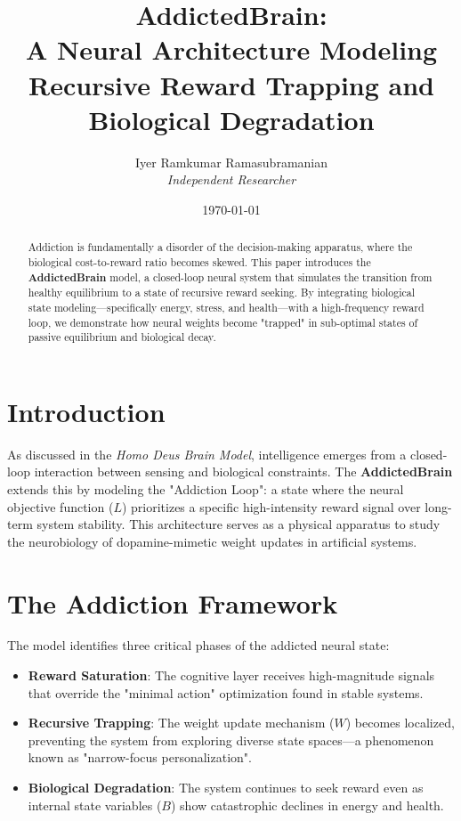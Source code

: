\documentclass[12pt]{article}
\title{\textbf{AddictedBrain: \\ A Neural Architecture Modeling Recursive Reward Trapping and Biological Degradation}}
\author{Iyer Ramkumar Ramasubramanian \\ \textit{Independent Researcher}}
\date{\today}
\begin{document}
\maketitle

\begin{abstract}
Addiction is fundamentally a disorder of the decision-making apparatus, where the biological cost-to-reward ratio becomes skewed. This paper introduces the \textbf{AddictedBrain} model, a closed-loop neural system that simulates the transition from healthy equilibrium to a state of recursive reward seeking. By integrating biological state modeling—specifically energy, stress, and health—with a high-frequency reward loop, we demonstrate how neural weights become "trapped" in sub-optimal states of passive equilibrium and biological decay.
\end{abstract}

\section{Introduction}
As discussed in the \textit{Homo Deus Brain Model}, intelligence emerges from a closed-loop interaction between sensing and biological constraints. The \textbf{AddictedBrain} extends this by modeling the "Addiction Loop": a state where the neural objective function ($L$) prioritizes a specific high-intensity reward signal over long-term system stability. This architecture serves as a physical apparatus to study the neurobiology of dopamine-mimetic weight updates in artificial systems.

\section{The Addiction Framework}

The model identifies three critical phases of the addicted neural state:

\begin{itemize}
\item \textbf{Reward Saturation}: The cognitive layer receives high-magnitude signals that override the "minimal action" optimization found in stable systems.
\item \textbf{Recursive Trapping}: The weight update mechanism ($W$) becomes localized, preventing the system from exploring diverse state spaces—a phenomenon known as "narrow-focus personalization".
\item \textbf{Biological Degradation}: The system continues to seek reward even as internal state variables ($B$) show catastrophic declines in energy and health.
\end{itemize}
\end{document}

